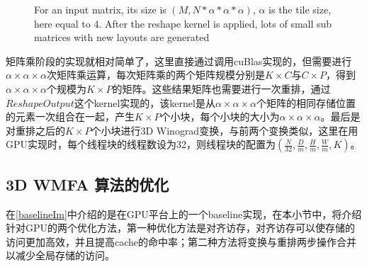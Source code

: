 \begin{figure}[tbh]%
\centering
{}
\caption{For an input matrix, its size is $(M,N*\alpha *\alpha *\alpha)$, $\alpha$ is the tile size, here equal to 4. After the reshape kernel is applied, lots of small sub matrices with new layouts are generated}
\label{reshape}
\end{figure}

矩阵乘阶段的实现就相对简单了，这里直接通过调用cuBlas实现的，但需要进行$\alpha \times \alpha \times \alpha$次矩阵乘运算，每次矩阵乘的两个矩阵规模分别是$K \times C$与$C \times P$，得到$\alpha \times \alpha \times \alpha$个规模为$K \times P$的矩阵。这些结果矩阵也需要进行一次重排，通过$ReshapeOutput$这个kernel实现的，该kernel是从$\alpha \times \alpha \times \alpha$个矩阵的相同存储位置的元素一次组合在一起，产生$K \times P$个小块，每个小块的大小为$\alpha \times \alpha \times \alpha$。最后是对重排之后的$K \times P$个小块进行3D Winograd变换，与前两个变换类似，这里在用GPU实现时，每个线程块的线程数设为32，则线程块的配置为$(\frac{N}{32},\frac{D}{m},\frac{H}{m},\frac{W}{m},K)$。

\subsection{3D WMFA 算法的优化}
在\ref{baselineIm}中介绍的是在GPU平台上的一个baseline实现，在本小节中，将介绍针对GPU的两个优化方法，第一种优化方法是对齐访存，对齐访存可以使存储的访问更加高效，并且提高cache的命中率；第二种方法将变换与重排两步操作合并以减少全局存储的访问。

